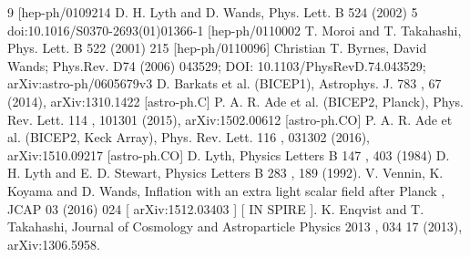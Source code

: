 \documentclass[amssymb,twocolumn,prd,nofootinbib,showpacs]{revtex4-1}
\begin{document}
\begin{thebibliography}{9}
[hep-ph/0109214
 D. H. Lyth and D. Wands, Phys. Lett. B
524
(2002) 5 doi:10.1016/S0370-2693(01)01366-1
[hep-ph/0110002
 T. Moroi and T. Takahashi, Phys. Lett. B
522
(2001) 215 [hep-ph/0110096]
 Christian T. Byrnes, David Wands;  Phys.Rev. D74 (2006) 043529; DOI:  	10.1103/PhysRevD.74.043529;  arXiv:astro-ph/0605679v3
  D. Barkats
et al.
(BICEP1), Astrophys. J.
783
, 67 (2014), arXiv:1310.1422 [astro-ph.C]
 P. A. R. Ade
et al.
(BICEP2, Planck), Phys. Rev. Lett.
114
, 101301 (2015), arXiv:1502.00612
[astro-ph.CO]
  P.  A.  R.  Ade
et al.
(BICEP2,   Keck  Array),  Phys.  Rev.  Lett.
116
,  031302  (2016),
arXiv:1510.09217 [astro-ph.CO]
  D. Lyth, Physics Letters B
147
, 403  (1984)
  D. H. Lyth and E. D. Stewart, Physics Letters B
283
, 189  (1992).
%
%
%
 V. Vennin, K. Koyama and D. Wands,
Inflation with an extra light scalar field after Planck
,
JCAP
03
(2016) 024 [
arXiv:1512.03403
] [
IN
SPIRE
].
K.  Enqvist  and  T.  Takahashi,  Journal  of  Cosmology  and  Astroparticle  Physics
2013
,  034
17
(2013),  arXiv:1306.5958.

%
%
%



\end{thebibliography}
\end{document}
